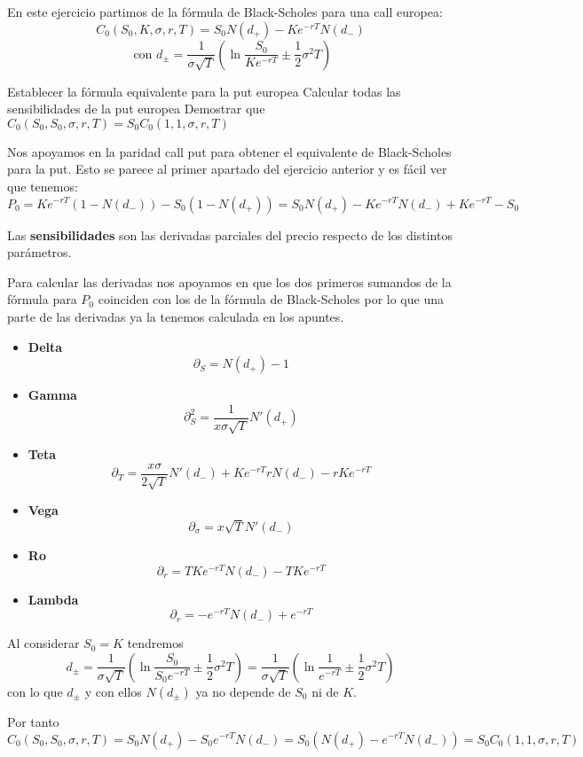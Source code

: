 \begin{problem}[2]
En este ejercicio partimos de la fórmula de Black-Scholes para una call europea:
\[C_0(S_0,K,σ,r,T)=S_0N(d_+)-Ke^{-rT}N(d_-) \]
\[\text{   con } d_{\pm} = \frac{1}{σ\sqrt{T}}\left( \ln \frac{S_0}{Ke^{-rT}}\pm \frac{1}{2}σ^2T\right)\]

\ppart Establecer la fórmula equivalente para la put europea
\ppart Calcular todas las sensibilidades de la put europea
\ppart Demostrar que $C_0(S_0,S_0,σ,r,T)=S_0C_0(1,1,σ,r,T)$
\solution
{}

\spart

Nos apoyamos en la paridad call put para obtener el equivalente de Black-Scholes para la put. Esto se parece al primer apartado del ejercicio anterior y es fácil ver que tenemos:
\[P_0 = Ke^{-rT}(1-N(d_-))-S_0(1-N(d_+)) = S_0N(d_+) -Ke^{-rT}N(d_-)+Ke^{-rT} -S_0 \]

\spart

Las \textbf{sensibilidades} son las derivadas parciales del precio respecto de los distintos parámetros.

Para calcular las derivadas nos apoyamos en que los dos primeros sumandos de la fórmula para $P_0$ coinciden con los de la fórmula de Black-Scholes por lo que una parte de las derivadas ya la tenemos calculada en los apuntes.
\begin{itemize}
\item \textbf{Delta}
\[\partial_S = N(d_+)-1\]
\item \textbf{Gamma}
\[\partial^2_S = \frac{1}{xσ\sqrt{T}}N'(d_+)\]
\item \textbf{Teta}
\[\partial_T = \frac{xσ}{2\sqrt{T}}N'(d_-) + Ke^{-rT}rN(d_-)-rKe^{-rT}\]
\item \textbf{Vega}\\
\[\partial_σ = x\sqrt{T}N'(d_{-}) \]
\item \textbf{Ro}\\
\[\partial_r = TKe^{-rT}N(d_-)-TKe^{-rT}\]
\item \textbf{Lambda}\\
\[\partial_r = -e^{-rT}N(d_-)+e^{-rT}\]
\end{itemize}

\spart

Al considerar $S_0=K$ tendremos
\[d_{\pm} = \frac{1}{σ\sqrt{T}}\left( \ln \frac{S_0}{S_0e^{-rT}}\pm \frac{1}{2}σ^2T\right)  = \frac{1}{σ\sqrt{T}}\left( \ln \frac{1}{e^{-rT}}\pm \frac{1}{2}σ^2T\right)\]
con lo que $d_{\pm}$ y con ellos $N(d_{\pm})$ ya no depende de $S_0$ ni de $K$.

Por tanto
\[C_0(S_0,S_0,σ,r,T) = S_0N(d_+)-S_0e^{-rT}N(d_-) = S_0\left(N(d_+)-e^{-rT}N(d_-) \right) = S_0 C_0(1,1,σ,r,T)\]
\end{problem}

